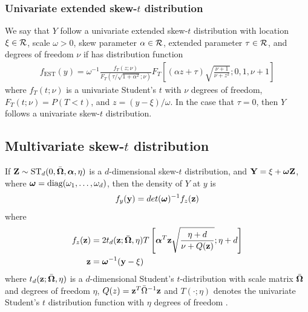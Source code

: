 \documentclass[11pt]{article}
\begin{document}
\subsubsection*{Univariate extended skew-$t$ distribution}
We say that $Y$ follow a univariate extended skew-$t$ distribution with location $\xi \in {\cal R}$, scale $\omega > 0$, skew parameter $\alpha \in {\cal R}$, extended parameter $\tau \in {\cal R}$, and degrees of freedom $\nu$ if has distribution function
\begin{align}
  f_{\text{EST}}(y) = \omega^{-1} \frac{ f_T (z; \nu) }{ F_T(\tau / \sqrt{ 1 + \alpha^2}; \nu)} F_T\left[ (\alpha z + \tau) \sqrt{ \frac{ \nu + 1 }{ \nu + z^2}}; 0, 1, \nu + 1 \right]
\end{align}
where $f_T(t; \nu)$ is a univariate Student's $t$ with $\nu$ degrees of freedom, $F_T(t; \nu) = P(T < t)$, and \hbox{$z = (y - \xi) / \omega$}.
In the case that $\tau = 0$, then $Y$ follows a univariate skew-$t$ distribution.

\subsection*{Multivariate skew-$t$ distribution}
If $\mbox{\bf Z} \sim \text{ST}_d(0, \bar{\mbox{\boldmath $\Omega$}}, \mbox{\boldmath $\alpha$}, \eta)$ is a $d$-dimensional skew-$t$ distribution, and $\mbox{\bf Y} = \xi + \mbox{\boldmath $\omega$} \mbox{\bf Z}$, where $\mbox{\boldmath $\omega$} = \text{diag}(\omega_1, \ldots, \omega_d)$, then the density of $Y$ at $y$ is
\begin{align}
  f_y(\mbox{\bf y}) = det(\mbox{\boldmath $\omega$})^{-1} f_z(\mbox{\bf z})
\end{align}
where
\begin{align}
  f_z(\mbox{\bf z}) &= 2 t_d(\mbox{\bf z}; \bar{\mbox{\boldmath $\Omega$}}, \eta) T \left[ \mbox{\boldmath $\alpha$}^T \mbox{\bf z} \sqrt{ \frac{\eta + d}{\nu + Q(\mbox{\bf z})} }; \eta + d\right] \\
  \mbox{\bf z} &= \mbox{\boldmath $\omega$}^{-1}(\mbox{\bf y} - \xi)
\end{align}
where $t_d(\mbox{\bf z}; \bar{\mbox{\boldmath $\Omega$}}, \eta)$ is a $d$-dimensional Student's $t$-distribution with scale matrix $\bar{\mbox{\boldmath $\Omega$}}$ and degrees of freedom $\eta$, $Q(z) = \mbox{\bf z}^T \bar{\Omega}^{-1}\mbox{\bf z}$ and $T(\cdot; \eta)$ denotes the univariate Student's $t$ distribution function with $\eta$ degrees of freedom \citep{Azzalini2013}.
\end{document}
